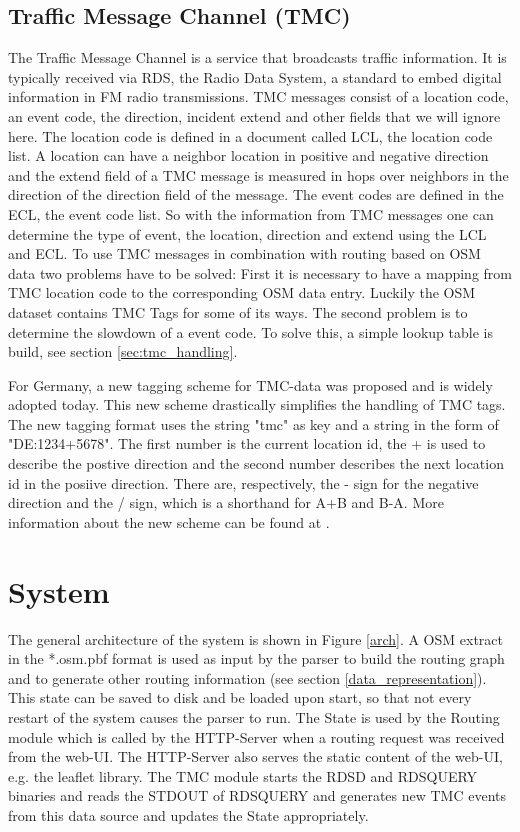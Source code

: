 \documentclass[a4paper]{scrartcl}
\begin{document}
\subsection{Traffic Message Channel (TMC)}
The Traffic Message Channel is a service that broadcasts traffic information. It is typically received via RDS, the Radio Data System, a standard to embed digital information in FM radio transmissions. TMC messages consist of a location code, an event code, the direction, incident extend and other fields that we will ignore here. The location code is defined in a document called LCL, the location code list. A location can have a neighbor location in positive and negative direction and the extend field of a TMC message is measured in hops over neighbors in the direction of the direction field of the message. The event codes are defined in the ECL, the event code list. So with the information from TMC messages one can determine the type of event, the location, direction and extend using the LCL and ECL. To use TMC messages in combination with routing based on OSM data two problems have to be solved: First it is necessary to have a mapping from TMC location code to the corresponding OSM data entry. Luckily the OSM dataset contains TMC Tags for some of its ways. The second problem is to determine the slowdown of a event code. To solve this, a simple lookup table is build, see section \ref{sec:tmc_handling}. 

For Germany, a new tagging scheme for TMC-data was proposed and is widely adopted today. This new scheme drastically simplifies the handling of TMC tags. The new tagging format uses the string "tmc" as key and a string in the form of "DE:1234+5678". The first number is the current location id, the + is used to describe the postive direction and the second number describes the next location id in the posiive direction. There are, respectively, the - sign for the negative direction and the / sign, which is a shorthand for A+B and B-A. More information about the new scheme can be found at \cite{osm_wiki_tmc_new_scheme}.

\section{System}
\label{sys}
The general architecture of the system is shown in Figure \ref{arch}. A OSM extract in the *.osm.pbf format is used as input by the parser to build the routing graph and to generate other routing information (see section \ref{data_representation}). This state can be saved to disk and be loaded upon start, so that not every restart of the system causes the parser to run. The State is used by the Routing module which is called by the HTTP-Server when a routing request was received from the web-UI. The HTTP-Server also serves the static content of the web-UI, e.g. the leaflet library. The TMC module starts the RDSD and RDSQUERY binaries and reads the STDOUT of RDSQUERY and generates new TMC events from this data source and updates the State appropriately.
\end{document}

